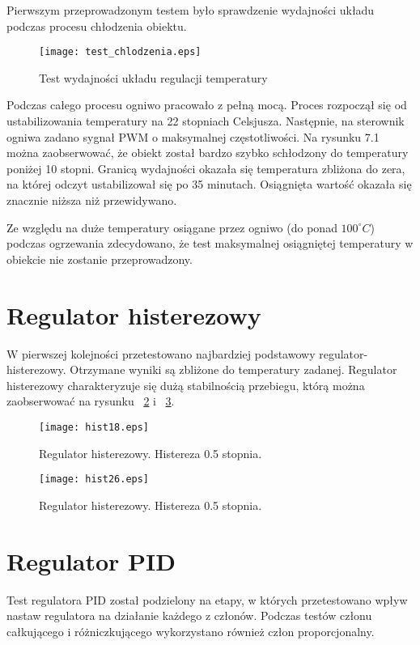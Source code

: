 Pierwszym przeprowadzonym testem było sprawdzenie wydajności układu podczas procesu chłodzenia obiektu.
\begin{figure}[H]
	\centering
	\texttt{[image: test\_chlodzenia.eps]}
	\caption{Test wydajności układu regulacji temperatury}
	\label{fig:chlodzenie}
\end{figure}
Podczas całego procesu ogniwo pracowało z pełną mocą. Proces rozpoczął się od ustabilizowania temperatury na 22 stopniach Celsjusza. Następnie, na sterownik ogniwa zadano sygnał PWM o maksymalnej częstotliwości. Na rysunku 7.1 można zaobserwować, że obiekt został bardzo szybko schłodzony do temperatury poniżej 10 stopni. Granicą wydajności okazała się temperatura zbliżona do zera, na której odczyt ustabilizował się po 35 minutach. Osiągnięta wartość okazała się znacznie niższa niż przewidywano.

Ze względu na duże temperatury osiągane przez ogniwo (do ponad $100^{\circ} C$) podczas ogrzewania zdecydowano, że test maksymalnej osiągniętej temperatury w obiekcie nie zostanie przeprowadzony.
\section{Regulator histerezowy}
W pierwszej kolejności przetestowano najbardziej podstawowy regulator- histerezowy. Otrzymane wyniki są zbliżone do temperatury zadanej. Regulator histerezowy charakteryzuje się dużą stabilnością przebiegu, którą można zaobserwować na rysunku ~\ref{fig:hist18} i ~\ref{fig:hist26}.
\begin{figure}[H]
	\centering
	\texttt{[image: hist18.eps]}
	\caption{Regulator histerezowy. Histereza 0.5 stopnia.}
	\label{fig:hist18}
\end{figure}

\begin{figure}[H]
	\centering
	\texttt{[image: hist26.eps]}
	\caption{Regulator histerezowy. Histereza 0.5 stopnia.}
	\label{fig:hist26}
\end{figure}
\newpage
\section{Regulator PID}
Test regulatora PID został podzielony na etapy, w których przetestowano wpływ nastaw regulatora na działanie każdego z członów. Podczas testów członu całkującego i różniczkującego wykorzystano również człon proporcjonalny.

